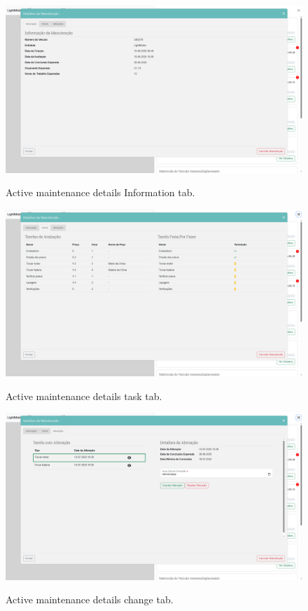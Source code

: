 \begin{figure}[h]
  \caption{Active maintenance details Information tab.}
  \centering
  \includegraphics[width=\textwidth]{figs/Implementation/rececionist/maintenance_details}
  \label{fig:impReceMaintHome}
\end{figure}

\begin{figure}[h]
  \caption{Active maintenance details task tab.}
  \centering
  \includegraphics[width=\textwidth]{figs/Implementation/rececionist/maintenance_details_task}
  \label{fig:impReceMaintTask}
\end{figure}


\begin{figure}[h]
  \caption{Active maintenance details change tab.}
  \centering
  \includegraphics[width=\textwidth]{figs/Implementation/rececionist/maintenance_details_change}
  \label{fig:impReceMaintChange}
\end{figure}


